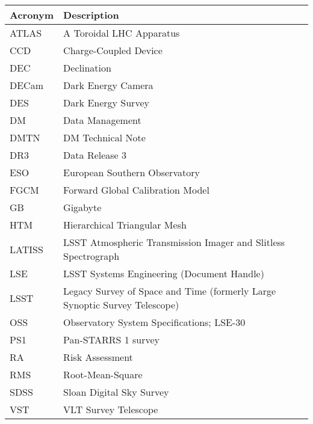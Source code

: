 \addtocounter{table}{-1}
\begin{longtable}{p{}p{}}\hline
\textbf{Acronym} & \textbf{Description}  \\\hline

ATLAS & A Toroidal LHC Apparatus \\\hline
CCD & Charge-Coupled Device \\\hline
DEC & Declination \\\hline
DECam & Dark Energy Camera \\\hline
DES & Dark Energy Survey \\\hline
DM & Data Management \\\hline
DMTN & DM Technical Note \\\hline
DR3 & Data Release 3 \\\hline
ESO & European Southern Observatory \\\hline
FGCM & Forward Global Calibration Model \\\hline
GB & Gigabyte \\\hline
HTM & Hierarchical Triangular Mesh \\\hline
LATISS & LSST Atmospheric Transmission Imager and Slitless Spectrograph \\\hline
LSE & LSST Systems Engineering (Document Handle) \\\hline
LSST & Legacy Survey of Space and Time (formerly Large Synoptic Survey Telescope) \\\hline
OSS & Observatory System Specifications; LSE-30 \\\hline
PS1 & Pan-STARRS 1 survey \\\hline
RA & Risk Assessment \\\hline
RMS & Root-Mean-Square \\\hline
SDSS & Sloan Digital Sky Survey \\\hline
VST & VLT Survey Telescope \\\hline
\end{longtable}

